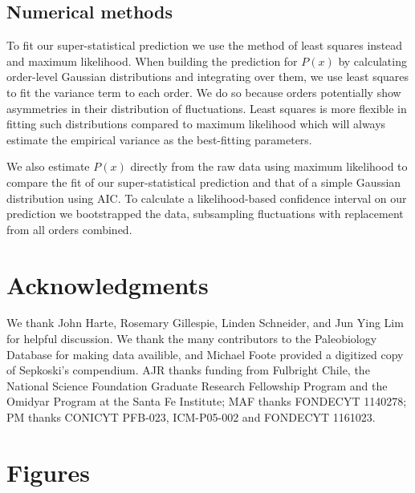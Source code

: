 \documentclass[12pt]{article}
\begin{document}
\subsection*{Numerical methods} \label{sec:numMeth} To fit our
super-statistical prediction we use the method of least squares
instead and maximum likelihood. When building the prediction for
$P(x)$ by calculating order-level Gaussian distributions and
integrating over them, we use least squares to fit the variance term
to each order. We do so because orders potentially show asymmetries in
their distribution of fluctuations. Least squares is more flexible in
fitting such distributions compared to maximum likelihood which will
always estimate the empirical variance as the best-fitting parameters.

We also estimate $P(x)$ directly from the raw data using maximum
likelihood to compare the fit of our super-statistical prediction and
that of a simple Gaussian distribution using AIC. To calculate a
likelihood-based confidence interval on our prediction we bootstrapped
the data, subsampling fluctuations with replacement from all orders
combined.

\section*{Acknowledgments}
We thank John Harte, Rosemary Gillespie, Linden Schneider, and Jun
Ying Lim for helpful discussion. We thank the many contributors to the
Paleobiology Database for making data availible, and Michael Foote
provided a digitized copy of Sepkoski's compendium. AJR thanks funding
from Fulbright Chile, the National Science Foundation Graduate
Research Fellowship Program and the Omidyar Program at the Santa Fe
Institute; MAF thanks FONDECYT 1140278; PM thanks CONICYT PFB-023,
ICM-P05-002 and FONDECYT 1161023.

\clearpage



\clearpage

\section*{Figures}
\end{document}
